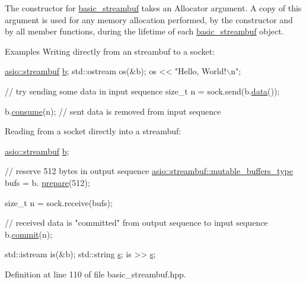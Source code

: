 The constructor for {\ttfamily \hyperlink{classasio_1_1basic__streambuf}{basic\+\_\+streambuf}} takes an Allocator argument. A copy of this argument is used for any memory allocation performed, by the constructor and by all member functions, during the lifetime of each {\ttfamily \hyperlink{classasio_1_1basic__streambuf}{basic\+\_\+streambuf}} object.

\begin{DoxyParagraph}{Examples}
Writing directly from an streambuf to a socket\+: 
\begin{DoxyCode}
\hyperlink{classasio_1_1basic__streambuf}{asio::streambuf} \hyperlink{group__async__read_ga945a5c18fa77a9e2eba420f8f44b2a4f}{b};
std::ostream os(&b);
os << \textcolor{stringliteral}{"Hello, World!\(\backslash\)n"};

\textcolor{comment}{// try sending some data in input sequence}
\textcolor{keywordtype}{size\_t} n = sock.send(b.\hyperlink{classasio_1_1basic__streambuf_a0bcecbf99eb1d32613738a73db9de4c9}{data}());

b.\hyperlink{classasio_1_1basic__streambuf_a83ca4bad37c9c96f72eda6c8ef133df4}{consume}(n); \textcolor{comment}{// sent data is removed from input sequence}
\end{DoxyCode}

\end{DoxyParagraph}
Reading from a socket directly into a streambuf\+: 
\begin{DoxyCode}
\hyperlink{classasio_1_1basic__streambuf}{asio::streambuf} \hyperlink{group__async__read_ga945a5c18fa77a9e2eba420f8f44b2a4f}{b};

\textcolor{comment}{// reserve 512 bytes in output sequence}
\hyperlink{classasio_1_1mutable__buffers__1}{asio::streambuf::mutable\_buffers\_type} bufs = b.
      \hyperlink{classasio_1_1basic__streambuf_a4f19d44bcf40de432f9e6984df959e73}{prepare}(512);

\textcolor{keywordtype}{size\_t} n = sock.receive(bufs);

\textcolor{comment}{// received data is "committed" from output sequence to input sequence}
b.\hyperlink{classasio_1_1basic__streambuf_a6d01805ae2a9382cbb81934111c8ea1c}{commit}(n);

std::istream is(&b);
std::string \hyperlink{group__async__connect_ga31ab74b9ea6c77932dddd016cfc7920a}{s};
is >> \hyperlink{group__async__connect_ga31ab74b9ea6c77932dddd016cfc7920a}{s};
\end{DoxyCode}
 

Definition at line 110 of file basic\+\_\+streambuf.\+hpp.



